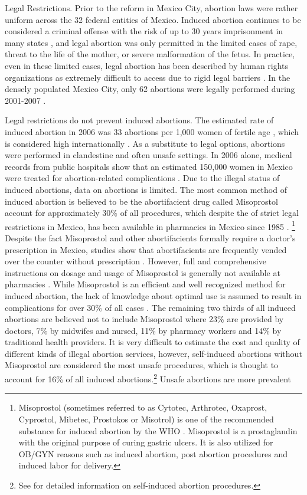 \documentclass[a4paper,11pt]{article}
\begin{document}
\begin{spacing}{1.5}
Legal Restrictions. Prior to the reform in Mexico City, abortion laws were rather uniform across the 32 federal entities of Mexico. Induced abortion continues to be considered a criminal offense with the risk of up to 30 years imprisonment in many states \citep{GIRE2009}, and legal abortion was only permitted in the limited cases of rape, threat to the life of the mother, or severe malformation of the fetus.  In practice, even in these limited cases, legal abortion has been described by human rights organizations as extremely difficult to access due to rigid legal barriers \citep{GIRE2009}. In the densely populated Mexico City, only 62 abortions were legally performed during 2001-2007 \citep{Becker2013}.

Legal restrictions do not prevent induced abortions. The estimated rate of induced abortion in 2006 was 33 abortions per 1,000 women of fertile age \citep{ juarez2008estimates}, which is considered high internationally \citep{Becker2013}. As a substitute to legal options, abortions were performed in clandestine and often unsafe settings. In 2006 alone, medical records from public hospitals show that an estimated 150,000 women in Mexico were treated for abortion-related complications \citep{ juarez2008estimates}. Due to the illegal status of induced abortions, data on abortions is limited. The most common method of induced abortion is believed to be the abortifacient drug called Misoprostol account for approximately 30\% of all procedures\citep{GIRE2009}, which despite the of strict legal restrictions in Mexico, has been available in pharmacies in Mexico since 1985 \citep{lara2011often}. \footnote{Misoprostol (sometimes referred to as Cytotec, Arthrotec, Oxaprost, Cyprostol, Mibetec, Prostokos or Misotrol) is one of the recommended substance for induced abortion by the WHO \citep{lara2011often}. Misoprostol is a prostaglandin with the original purpose of curing gastric ulcers. It is also utilized for OB/GYN reasons such as induced abortion, post abortion procedures and induced labor for delivery\citep{kulier2007medical}.} Despite the fact Misoprostol and other abortifacients formally require a doctor's prescription in Mexico, studies show that abortifacients are frequently vended over the counter without prescription \citep{lara2011often}.  However, full and comprehensive instructions on dosage and usage of Misoprostol is generally not available at pharmacies \citep{lara2011often}. While Misoprostol is an efficient and well recognized method for induced abortion, the lack of knowledge about optimal use is assumed to result in complications for over 30\% of all cases \citep{GIRE2009}. The remaining two thirds of all induced abortions are believed not to include Misoprostol where 23\% are provided by doctors, 7\% by midwifes and nursed, 11\% by pharmacy workers and 14\% by traditional health providers. It is very difficult to estimate the cost and quality of different kinds of illegal abortion services, however, self-induced abortions without Misoprostol are considered the most unsafe procedures, which is thought to account for 16\% of all induced abortions.\footnote{See \cite{grimes2005risks} for detailed information on self-induced abortion procedures.} Unsafe abortions are more prevalent 
\end{spacing}
\end{document}
